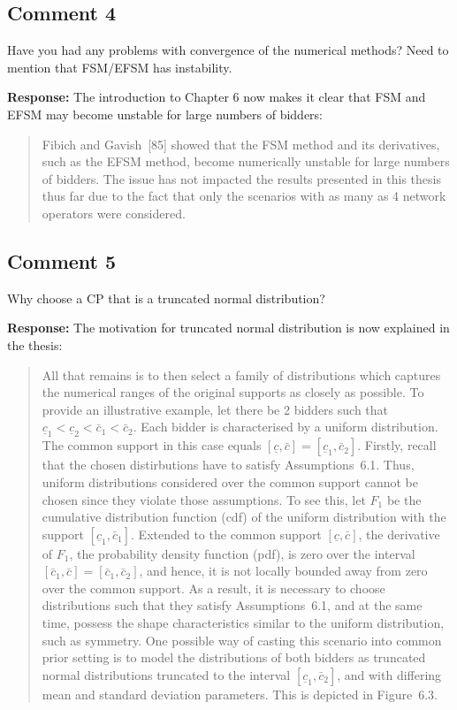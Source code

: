 \documentclass[10pt,a4paper,notitlepage]{article}
\numberwithin{equation}{section}
\begin{document}
\subsection{Comment 4}
Have you had any problems with convergence of the numerical methods? Need to mention that FSM/EFSM has instability.

\textbf{Response:}
The introduction to Chapter 6 now makes it clear that FSM and EFSM may become unstable for large numbers of bidders:
\begin{quote}
Fibich and Gavish~[85] showed that the FSM method and its derivatives, such as the EFSM method, become numerically unstable for large numbers of bidders. The issue has not impacted the results presented in this thesis thus far due to the fact that only the scenarios with as many as 4 network operators were considered.
\end{quote}

\subsection{Comment 5}
Why choose a CP that is a truncated normal distribution?

\textbf{Response:}
The motivation for truncated normal distribution is now explained in the thesis:
\begin{quote}
All that remains is to then select a family of distributions which captures the numerical ranges of the original supports as closely as possible. To provide an illustrative example, let there be 2 bidders such that $\underline{c}_1 < \underline{c}_2 < \bar{c}_1 < \bar{c}_2$. Each bidder is characterised by a uniform distribution. The common support in this case equals $[\underline{c}, \bar{c}] = [\underline{c}_1, \bar{c}_2]$. Firstly, recall that the chosen distirbutions have to satisfy Assumptions~6.1. Thus, uniform distributions considered over the common support cannot be chosen since they violate those assumptions. To see this, let $F_1$ be the cumulative distribution function (cdf) of the uniform distribution with the support $[\underline{c}_1, \bar{c}_1]$. Extended to the common support $[\underline{c}, \bar{c}]$, the derivative of $F_1$, the probability density function (pdf), is zero over the interval $[\bar{c}_1, \bar{c}] = [\bar{c}_1, \bar{c}_2]$, and hence, it is not locally bounded away from zero over the common support. As a result, it is necessary to choose distributions such that they satisfy Assumptions~6.1, and at the same time, possess the shape characteristics similar to the uniform distribution, such as symmetry. One possible way of casting this scenario into common prior setting is to model the distributions of both bidders as truncated normal distributions truncated to the interval $[\underline{c}_1, \bar{c}_2]$, and with differing mean and standard deviation parameters. This is depicted in Figure~6.3.
\end{quote}
\end{document}
